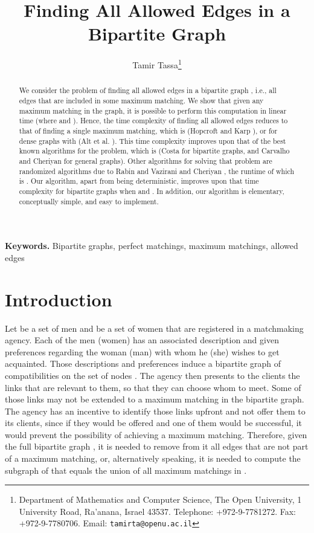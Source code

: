 \documentclass[times, 11pt]{article}
\begin{document}
\title{Finding All Allowed Edges in a Bipartite Graph}

\author{
\begin{tabular}{c}
Tamir Tassa\thanks{Department of Mathematics and Computer Science, The Open University, 1 University Road, Ra'anana, Israel 43537. Telephone:
+972-9-7781272. Fax: +972-9-7780706. Email: {\tt tamirta@openu.ac.il}}\\
\end{tabular}
}



\maketitle

\begin{abstract}
We consider the problem of finding all allowed edges in a bipartite graph , i.e., all edges
that are included in some maximum matching.
We show that given any maximum matching in the graph,
it is possible to perform this computation in linear time  (where  and ).
Hence, the time complexity of finding all allowed edges reduces to that of finding a single maximum matching, which
is  (Hopcroft and Karp \cite{HK}), or  for dense graphs with  (Alt et al. \cite{ABMP}).
This time complexity improves upon that of the best known algorithms for the problem, which is  (Costa \cite{C94} for bipartite graphs,
and Carvalho and Cheriyan \cite{CC05} for general graphs).
Other algorithms for solving that problem are randomized algorithms due to Rabin and Vazirani \cite{RV89} and Cheriyan \cite{C97}, the
runtime of which is . Our algorithm, apart from being deterministic,
improves upon that time complexity for bipartite graphs
when  and . In addition, our algorithm is elementary, conceptually simple, and easy to implement.
\end{abstract}

\noindent
{\bf Keywords.} Bipartite graphs, perfect matchings, maximum matchings, allowed edges

\section{Introduction}
Let  be a set of men and  be a set of women that are registered in a matchmaking agency.
Each of the men (women)
has an associated description and given preferences regarding the woman (man) with whom he (she) wishes to get acquainted.
Those descriptions and preferences induce a bipartite graph  of compatibilities on the set of nodes .
The agency then presents to the clients the links that are relevant to them, so that
they can choose whom to meet.
Some of those links may not be extended to a maximum matching in the bipartite graph. The agency has an incentive to identify those links upfront
and not offer them to its clients, since if they would be offered and one of them would be successful, it would prevent the possibility of
achieving a maximum matching.
Therefore, given the full bipartite graph , it is needed to remove from it all edges that are not part of a maximum matching,
or, alternatively speaking, it is needed to compute the subgraph of  that equals the
union of all maximum matchings in .
\end{document}
